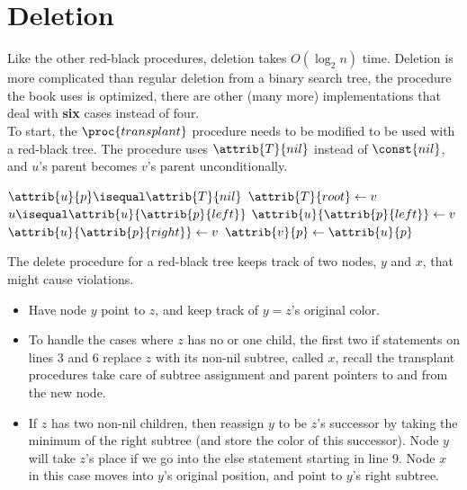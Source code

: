 \documentclass{article}
\begin{document}
\newpage

\section*{Deletion}
Like the other red-black procedures, deletion takes $O(\log_2n)$ time. Deletion is more complicated than regular deletion from a binary search tree, the procedure the book uses is optimized, there are other (many more) implementations that deal with \textbf{six} cases instead of four.
\\
To start, the $\proc{transplant}$ procedure needs to be modified to be used with a red-black tree. The procedure uses $\attrib{T}{nil}$ instead of $\const{nil}$, and $u$'s parent becomes $v$'s parent unconditionally.

\begin{codebox}
\li \If $\attrib{u}{p} \isequal \attrib{T}{nil}$
\li \Then
        $\attrib{T}{root} \gets{v}$
\li \ElseIf $u \isequal \attrib{u}{\attrib{p}{left}}$
\li \Then
        $\attrib{u}{\attrib{p}{left}} \gets{v}$
\li \Else
\li     $\attrib{u}{\attrib{p}{right}} \gets{v}$
    \End
\li $\attrib{v}{p} \gets{\attrib{u}{p}}$
\end{codebox}

The delete procedure for a red-black tree keeps track of two nodes, $y$ and $x$, that might cause violations. 

\begin{itemize}
    \item Have node $y$ point to $z$, and keep track of $y = z$'s original color.
    \item To handle the cases where $z$ has no or one child, the first two if statements on lines 3 and 6 replace $z$ with its non-nil subtree, called $x$, recall the transplant procedures take care of subtree assignment and parent pointers to and from the new node.
    \item If $z$ has two non-nil children, then reassign $y$ to be $z$'s successor by taking the minimum of the right subtree (and store the color of this successor). Node $y$ will take $z$'s place if we go into the else statement starting in line 9. Node $x$ in this case moves into $y$'s original position, and point to $y$'s right subtree.
\end{itemize}

\newpage
\end{document}
